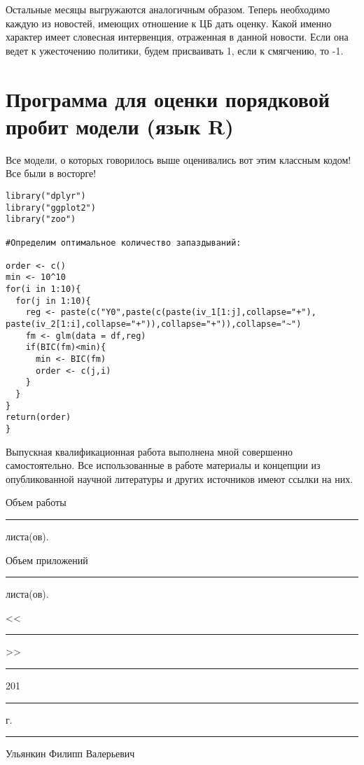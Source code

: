 Остальные месяцы выгружаются аналогичным образом. Теперь необходимо каждую из новостей, имеющих отношение к ЦБ дать оценку. Какой именно характер имеет словесная интервенция, отраженная в данной новости. Если она ведет к ужесточению политики, будем присваивать 1, если к смягчению, то -1.



\chapter[Программа~~  для~~  оценки~~  порядковой \\ пробит модели (язык R)]{Программа для оценки порядковой пробит модели (язык R)}\label{app-b}

Все модели, о которых говорилось выше оценивались вот этим классным кодом! Все были в восторге!

\begin{verbatim}
library("dplyr")
library("ggplot2")
library("zoo") 

#Определим оптимальное количество запаздываний:

order <- c()
min <- 10^10
for(i in 1:10){
  for(j in 1:10){
    reg <- paste(c("Y0",paste(c(paste(iv_1[1:j],collapse="+"),    paste(iv_2[1:i],collapse="+")),collapse="+")),collapse="~")
    fm <- glm(data = df,reg)
    if(BIC(fm)<min){
      min <- BIC(fm)
      order <- c(j,i)
    }
  }
}
return(order)
}
\end{verbatim}



\newpage
Выпускная квалификационная работа выполнена мной совершенно самостоятельно. Все использованные в работе материалы и концепции из опубликованной научной литературы и других источников имеют ссылки на них.

\vspace{2ex}

\noindent Объем работы  \rule{3em}{0.5pt} листа(ов).

\vspace{2ex}

\noindent Объем приложений \rule{3em}{0.5pt} листа(ов).

\vspace{4ex}

\noindent <<\rule{2em}{0.5pt}>> \rule{5em}{0.5pt} 201\rule{1em}{0.5pt} г. 

\vspace{4ex}

\noindent \rule{10em}{0.5pt} Ульянкин Филипп Валерьевич


